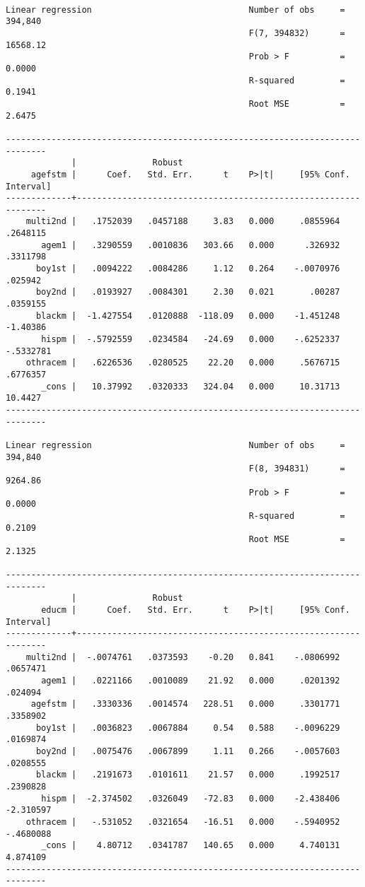 \documentclass[11pt]{article}
\begin{document}
\begin{verbatim}

Linear regression                               Number of obs     =    394,840
                                                F(7, 394832)      =   16568.12
                                                Prob > F          =     0.0000
                                                R-squared         =     0.1941
                                                Root MSE          =     2.6475

------------------------------------------------------------------------------
             |               Robust
     agefstm |      Coef.   Std. Err.      t    P>|t|     [95% Conf. Interval]
-------------+----------------------------------------------------------------
    multi2nd |   .1752039   .0457188     3.83   0.000     .0855964    .2648115
       agem1 |   .3290559   .0010836   303.66   0.000      .326932    .3311798
      boy1st |   .0094222   .0084286     1.12   0.264    -.0070976     .025942
      boy2nd |   .0193927   .0084301     2.30   0.021       .00287    .0359155
      blackm |  -1.427554   .0120888  -118.09   0.000    -1.451248    -1.40386
       hispm |  -.5792559   .0234584   -24.69   0.000    -.6252337   -.5332781
    othracem |   .6226536   .0280525    22.20   0.000     .5676715    .6776357
       _cons |   10.37992   .0320333   324.04   0.000     10.31713     10.4427
------------------------------------------------------------------------------

Linear regression                               Number of obs     =    394,840
                                                F(8, 394831)      =    9264.86
                                                Prob > F          =     0.0000
                                                R-squared         =     0.2109
                                                Root MSE          =     2.1325

------------------------------------------------------------------------------
             |               Robust
       educm |      Coef.   Std. Err.      t    P>|t|     [95% Conf. Interval]
-------------+----------------------------------------------------------------
    multi2nd |  -.0074761   .0373593    -0.20   0.841    -.0806992    .0657471
       agem1 |   .0221166   .0010089    21.92   0.000     .0201392     .024094
     agefstm |   .3330336   .0014574   228.51   0.000     .3301771    .3358902
      boy1st |   .0036823   .0067884     0.54   0.588    -.0096229    .0169874
      boy2nd |   .0075476   .0067899     1.11   0.266    -.0057603    .0208555
      blackm |   .2191673   .0101611    21.57   0.000     .1992517    .2390828
       hispm |  -2.374502   .0326049   -72.83   0.000    -2.438406   -2.310597
    othracem |   -.531052   .0321654   -16.51   0.000    -.5940952   -.4680088
       _cons |    4.80712   .0341787   140.65   0.000     4.740131    4.874109
------------------------------------------------------------------------------


\end{verbatim}
\end{document}
